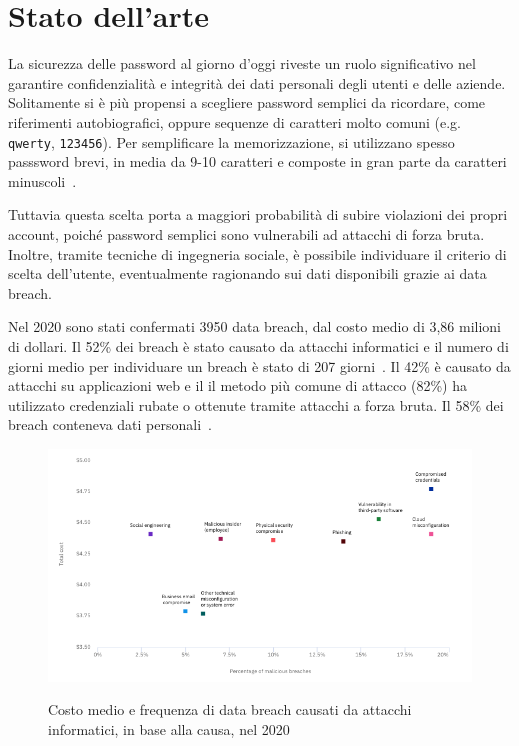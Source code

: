 \chapter{Stato dell'arte}

\label{ch:state of the art}

La sicurezza delle password al giorno d'oggi riveste un ruolo significativo nel garantire confidenzialità e integrità dei dati personali degli utenti e delle aziende. 
Solitamente si è più propensi a scegliere password semplici da ricordare, come riferimenti autobiografici, oppure sequenze di caratteri molto comuni (e.g. \texttt{qwerty}, \texttt{123456}).
Per semplificare la memorizzazione, si utilizzano spesso passsword brevi, in media da 9-10 caratteri e composte in gran parte da caratteri minuscoli~\cite{obspasshab}.

Tuttavia questa scelta porta a maggiori probabilità di subire violazioni dei propri account, poiché password semplici sono vulnerabili ad attacchi di forza bruta. Inoltre, tramite tecniche di ingegneria sociale, è possibile individuare il criterio di scelta dell'utente, eventualmente ragionando sui dati disponibili grazie ai data breach.

Nel 2020 sono stati confermati 3950 data breach, dal costo medio di 3,86 milioni di dollari. Il 52\% dei breach è stato causato da attacchi informatici e il numero di giorni medio per individuare un breach è stato di 207 giorni~\cite{ibmcost}.
Il 42\% è causato da attacchi su applicazioni web e il il metodo più comune di attacco (82\%) ha utilizzato credenziali rubate o ottenute tramite attacchi a forza bruta.
Il 58\% dei breach conteneva dati personali~\cite{verizon}.
\begin{figure}[h]
    \centering
    \includegraphics[width=15cm]{./immagini/average_cost_and_frequency_data_breaches.png}
    \label{data breach}
    \caption{Costo medio e frequenza di data breach causati da attacchi informatici, in base alla causa, nel 2020~\cite{ibmcost}}
\end{figure}

